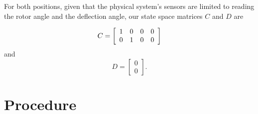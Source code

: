 For both positions, given that the physical system’s sensors are limited to reading the rotor angle and the deflection angle, our state space matrices \(C\) and \(D\) are

\[
    C =
    \left[\begin{array}{c c c c}
            1 & 0 & 0 & 0 \\
            0 & 1 & 0 & 0
        \end{array}\right]
\]
and
\[
    D =
    \left[\begin{array}{c}
            0 \\
            0
        \end{array}\right].
\]

\section{Procedure}
